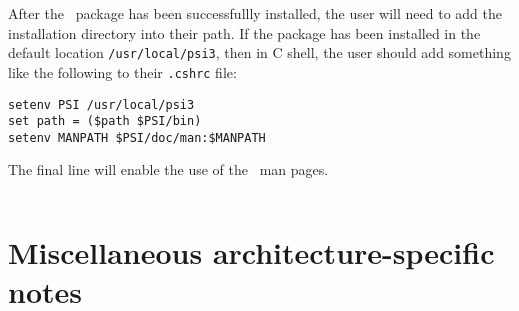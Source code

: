 \documentclass[12pt]{article}
\begin{document}
After the \PSIthree\ package has been successfullly installed, the user will
need to add the installation directory into their path.  If the package
has been installed in the default location {\tt /usr/local/psi3}, then
in C shell, the user should add something like the following to 
their {\tt .cshrc} file:
\begin{verbatim}
setenv PSI /usr/local/psi3
set path = ($path $PSI/bin)
setenv MANPATH $PSI/doc/man:$MANPATH
\end{verbatim}
The final line will enable the use of the \PSIthree\ man pages.
\begin{verbatim}
\end{verbatim}


\section{Miscellaneous architecture-specific notes}
\end{document}
